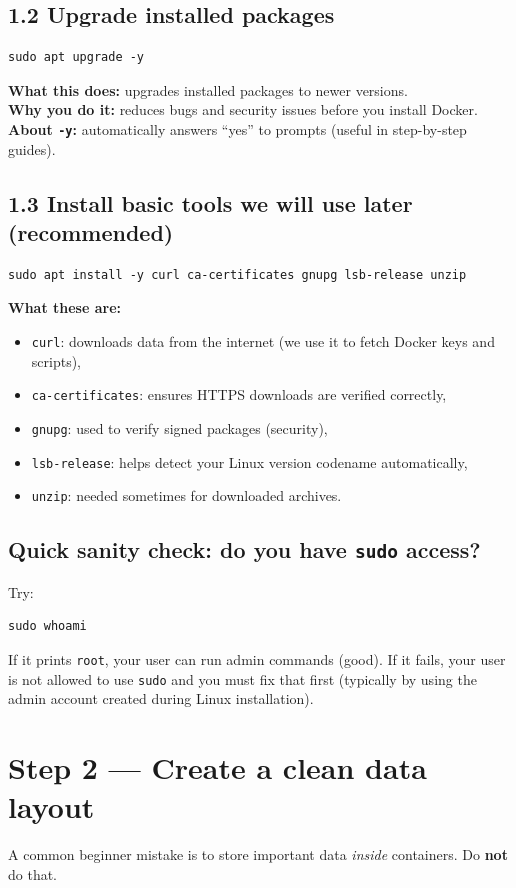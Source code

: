 \subsection{1.2 Upgrade installed packages}
\begin{lstlisting}
sudo apt upgrade -y
\end{lstlisting}
\textbf{What this does:} upgrades installed packages to newer versions. \\
\textbf{Why you do it:} reduces bugs and security issues before you install Docker. \\
\textbf{About \texttt{-y}:} automatically answers ``yes'' to prompts (useful in step-by-step guides).

\subsection{1.3 Install basic tools we will use later (recommended)}
\begin{lstlisting}
sudo apt install -y curl ca-certificates gnupg lsb-release unzip
\end{lstlisting}
\textbf{What these are:}
\begin{itemize}[leftmargin=*]
  \item \texttt{curl}: downloads data from the internet (we use it to fetch Docker keys and scripts),
  \item \texttt{ca-certificates}: ensures HTTPS downloads are verified correctly,
  \item \texttt{gnupg}: used to verify signed packages (security),
  \item \texttt{lsb-release}: helps detect your Linux version codename automatically,
  \item \texttt{unzip}: needed sometimes for downloaded archives.
\end{itemize}

\subsection{Quick sanity check: do you have \texttt{sudo} access?}
Try:
\begin{lstlisting}
sudo whoami
\end{lstlisting}
If it prints \texttt{root}, your user can run admin commands (good).
If it fails, your user is not allowed to use \texttt{sudo} and you must fix that first
(typically by using the admin account created during Linux installation).

\section{Step 2 --- Create a clean data layout}
A common beginner mistake is to store important data \emph{inside} containers.
Do \textbf{not} do that.

